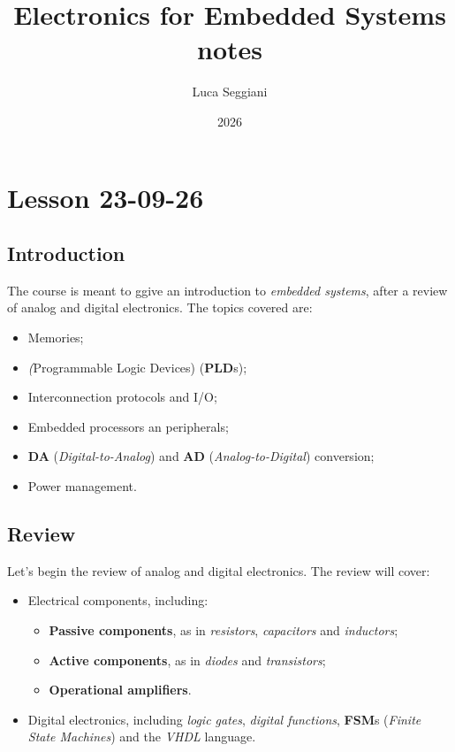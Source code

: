\documentclass[a4paper,11pt]{article}
\title{Electronics for Embedded Systems notes}
\author{Luca Seggiani}
\date{2026}
\begin{document}
\section{Lesson 23-09-26}

\thispagestyle{empty}
\pagestyle{fancy}


\subsection{Introduction}

The course is meant to ggive an introduction to \textit{embedded systems}, after a review of analog and digital electronics.
The topics covered are:
\begin{itemize}
	\item Memories;
	\item \textit(Programmable Logic Devices) (\textbf{PLD}s);
	\item Interconnection protocols and I/O;
	\item Embedded processors an peripherals;
	\item \textbf{DA} (\textit{Digital-to-Analog}) and \textbf{AD} (\textit{Analog-to-Digital}) conversion;
	\item Power management.
\end{itemize}

\subsection{Review}

Let's begin the review of analog and digital electronics.
The review will cover:
\begin{itemize}
	\item Electrical components, including:
		\begin{itemize}
			\item \textbf{Passive components}, as in \textit{resistors}, \textit{capacitors} and \textit{inductors};
			\item \textbf{Active components}, as in \textit{diodes} and \textit{transistors};
			\item \textbf{Operational amplifiers}.
		\end{itemize}
	\item Digital electronics, including \textit{logic gates}, \textit{digital functions}, \textbf{FSM}s (\textit{Finite State Machines}) and the \textit{VHDL} language.
\end{itemize}
\end{document}
